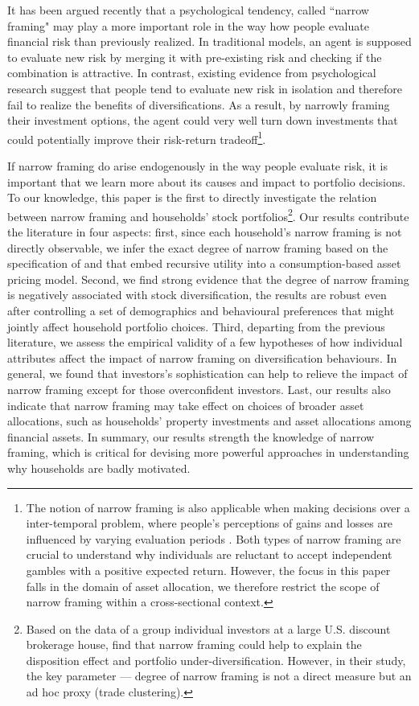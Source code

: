 \documentclass[ukenglish,nottitlepage,thmsb,11pt,letterpaper]{article}
\begin{document}
It has been argued recently that a psychological tendency, called ``narrow framing" may play a more important role in the way how people evaluate financial risk than previously realized. In traditional models, an agent is supposed to evaluate new risk by merging it with pre-existing risk and checking if the combination is attractive. In contrast, existing evidence from psychological research \citep[e.g.,][]{Barberis2006,Anagola2013,Beshears2016} suggest that people tend to evaluate new risk in isolation and therefore fail to realize the benefits of diversifications. As a result, by narrowly framing their investment options, the agent could very well turn down investments that could potentially improve their risk-return tradeoff\footnote{The notion of narrow framing is also applicable when making decisions over a inter-temporal problem, where people's perceptions of gains and losses are influenced by varying evaluation periods \citep{Thaler1997,Benartzi1999,Gneezy2003}. Both types of narrow framing are crucial to understand why individuals are reluctant to accept independent gambles with a positive expected return. However, the focus in this paper falls in the domain of asset allocation, we therefore restrict the scope of narrow framing within a cross-sectional context.}.

If narrow framing do arise endogenously in the way people evaluate risk, it is important that we learn more about its causes and impact to portfolio decisions. To our knowledge, this paper is the first to directly investigate the relation between narrow framing and households' stock portfolios\footnote{Based on the data of a group individual investors at a large U.S. discount brokerage house, \citet{Kumar2008} find that narrow framing could help to explain the disposition effect and portfolio under-diversification. However, in their study, the key parameter --- degree of narrow framing is not a direct measure but an ad hoc proxy (trade clustering).}. Our results contribute the literature in four aspects: first, since each household's narrow framing is not directly observable, we infer the exact degree of narrow framing based on the specification of \citet{Barberis2006} and \citet{Barberis2009} that embed recursive utility into a consumption-based asset pricing model\citep{Epstein1989,Epstein1991}. Second, we find strong evidence that the degree of narrow framing is negatively associated with stock diversification, the results are robust even after controlling a set of demographics and behavioural preferences that might jointly affect household portfolio choices. Third, departing from the previous literature, we assess the empirical validity of a few hypotheses of how individual attributes affect the impact of narrow framing on diversification behaviours. In general, we found that investors's sophistication can help to relieve the impact of narrow framing except for those overconfident investors. Last, our results also indicate that narrow framing may take effect on choices of broader asset allocations, such as households' property investments and asset allocations among financial assets. In summary, our results strength the knowledge of narrow framing, which is critical for devising more powerful approaches in understanding why households are badly motivated.
\end{document}

